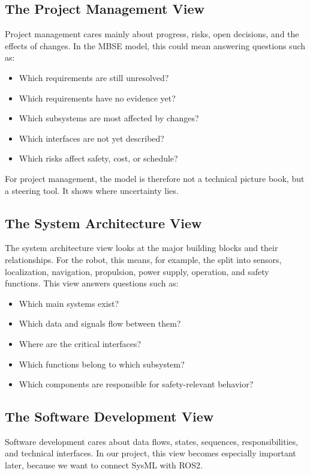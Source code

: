 \subsection{The Project Management View}
Project management cares mainly about progress, risks, open decisions, and the effects of changes. In the MBSE model, this could mean answering questions such as:

\begin{itemize}
    \item Which requirements are still unresolved?
    \item Which requirements have no evidence yet?
    \item Which subsystems are most affected by changes?
    \item Which interfaces are not yet described?
    \item Which risks affect safety, cost, or schedule?
\end{itemize}

For project management, the model is therefore not a technical picture book, but a steering tool. It shows where uncertainty lies.

\subsection{The System Architecture View}
The system architecture view looks at the major building blocks and their relationships. For the robot, this means, for example, the split into sensors, localization, navigation, propulsion, power supply, operation, and safety functions. This view answers questions such as:

\begin{itemize}
    \item Which main systems exist?
    \item Which data and signals flow between them?
    \item Where are the critical interfaces?
    \item Which functions belong to which subsystem?
    \item Which components are responsible for safety-relevant behavior?
\end{itemize}

\subsection{The Software Development View}
Software development cares about data flows, states, sequences, responsibilities, and technical interfaces. In our project, this view becomes especially important later, because we want to connect SysML with ROS2.

